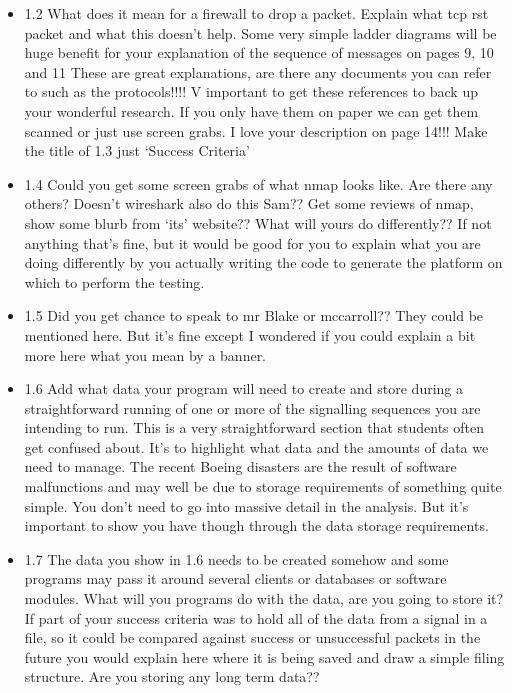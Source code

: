 \documentclass{article}
\begin{document}
\begin{itemize}
  \item{1.2 What does it mean for a firewall to drop a packet. Explain what tcp rst packet and what this doesn’t help.  Some very simple ladder diagrams will be huge benefit for your explanation of the sequence of messages on pages 9, 10 and 11 These are great explanations, are there any documents you can refer to such as the protocols!!!! V important to get these references to back up your wonderful research. If you only have them on paper we can get them scanned or just use screen grabs.  I love your description on page 14!!! Make the title of 1.3 just ‘Success Criteria’}

  \item{1.4 Could you get some screen grabs of what nmap looks like. Are there any others? Doesn’t wireshark also do this Sam?? Get some reviews of nmap, show some blurb from ‘its’ website?? What will yours do differently?? If not anything that’s fine, but it would be good for you to explain what you are doing differently by you actually writing the code to generate the platform on which to perform the testing. }

  \item{1.5 Did you get chance to speak to mr Blake or mccarroll?? They could be mentioned here. But it’s fine except I wondered if you could explain a bit more here what you mean by a banner. }

  \item{1.6 Add what data your program will need to create and store during a straightforward running of one or more of the signalling sequences you are intending to run.   This is a very straightforward section that students often get confused about. It’s to highlight what data and the amounts of data we need to manage. The recent Boeing disasters are the result of  software malfunctions and may well be due to storage requirements of something quite simple. You don’t need to go into massive detail in the analysis. But it’s important to show you have though through the data storage requirements. }

  \item{1.7 The data you show in 1.6 needs to be created somehow and some programs may pass it around several clients or databases or software modules.  What will you programs do with the data, are you going to store it? If part of your success criteria was to hold all of the data from a signal in a file, so it could be compared against success or unsuccessful packets in the future you would explain here where it is being saved and draw a simple filing structure. Are you storing any long term data??}


\end{itemize}
\end{document}
